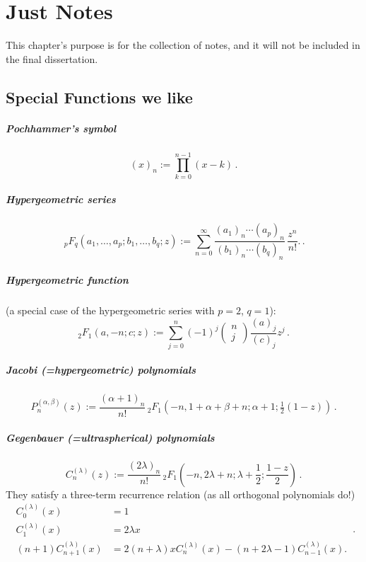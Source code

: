\chapter*{Just Notes}
This chapter's purpose is for the collection of notes, and it will not be included in the final dissertation.

\section*{Special Functions we like}

\paragraph{Pochhammer's symbol} $$(x)_n := \prod_{k=0}^{n-1} (x-k)\,.$$

\paragraph{Hypergeometric series}
$${\displaystyle \,{}_{p}F_{q}(a_{1},\ldots ,a_{p};b_{1},\ldots ,b_{q};z) := \sum _{n=0}^{\infty }{\frac {(a_{1})_{n}\cdots (a_{p})_{n}}{(b_{1})_{n}\cdots (b_{q})_{n}}}\,{\frac {z^{n}}{n!}}.}\,.$$

\paragraph{Hypergeometric function}
(a special case of the hypergeometric series with $p=2$, $q=1$):
$${}_2 F_1(a,-n;c;z) := \sum_{j=0}^n (-1)^j \begin{pmatrix}n \\j\end{pmatrix} \frac{(a)_j}{(c)_j}z^j\,.$$

\paragraph{Jacobi (=hypergeometric) polynomials}
$$P_{n}^{{(\alpha ,\beta )}}(z) := {\frac{(\alpha +1)_{n}}{n!}}\,{}_{2}F_{1}\left(-n,1+\alpha +\beta +n;\alpha +1;{\tfrac  {1}{2}}(1-z)\right)\,.$$

\paragraph{Gegenbauer (=ultraspherical) polynomials}
$$C_{n}^{{( \lambda )}}(z) := {\frac  {(2\lambda )_{n}}{n!}}\,_{2}F_{1}\left(-n,2\lambda +n;\lambda +{\frac  {1}{2}};{\frac  {1-z}{2}}\right)\,.$$
They satisfy a three-term recurrence relation (as all orthogonal polynomials do!)
$${\displaystyle {\begin{aligned}C_{0}^{(\lambda )}(x)&=1\\C_{1}^{(\lambda )}(x)&=2\lambda x\\(n+1)C_{n+1}^{(\lambda )}(x)&=2(n+\lambda )xC_{n}^{(\lambda )}(x)-(n+2\lambda -1)C_{n-1}^{(\lambda )}(x).\end{aligned}}}\,.$$
